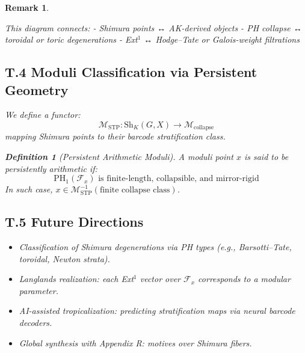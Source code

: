 \documentclass[11pt]{article}
\newtheorem{definition}[theorem]{Definition}
\newtheorem{remark}[theorem]{Remark}
\begin{document}
\begin{remark}
\vspace{1em}
\begin{center}
\end{center}
\vspace{1em}

This diagram connects:
- Shimura points ↔ AK-derived objects  
- PH collapse ↔ toroidal or toric degenerations  
- Ext$^1$ ↔ Hodge–Tate or Galois-weight filtrations

\subsection*{T.4 Moduli Classification via Persistent Geometry}

We define a functor:
\[
\mathscr{M}_{\mathrm{STP}}: \mathrm{Sh}_K(G,X) \to \mathcal{M}_{\mathrm{collapse}}
\]
mapping Shimura points to their barcode stratification class.

\begin{definition}[Persistent Arithmetic Moduli]
A moduli point \( x \) is said to be persistently arithmetic if:
\[
\mathrm{PH}_1(\mathcal{F}_x) \text{ is finite-length, collapsible, and mirror-rigid}
\]
In such case, \( x \in \mathscr{M}_{\mathrm{STP}}^{-1}(\text{finite collapse class}) \).
\end{definition}

\subsection*{T.5 Future Directions}

\begin{itemize}
  \item Classification of Shimura degenerations via PH types (e.g., Barsotti–Tate, toroidal, Newton strata).
  \item Langlands realization: each Ext$^1$ vector over \( \mathcal{F}_x \) corresponds to a modular parameter.
  \item AI-assisted tropicalization: predicting stratification maps via neural barcode decoders.
  \item Global synthesis with Appendix R: motives over Shimura fibers.
\end{itemize}


\end{remark}
\end{document}
